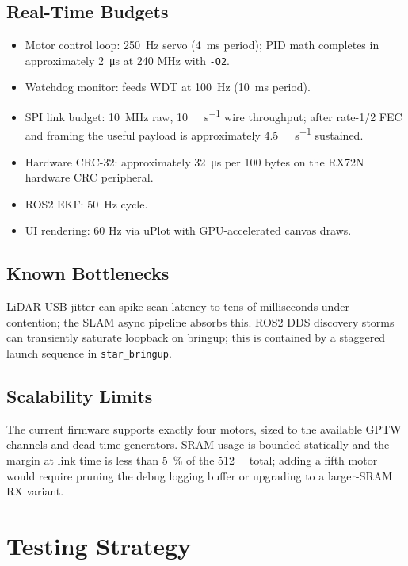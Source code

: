 \documentclass[11pt,letterpaper]{article}
\begin{document}
\subsection{Real-Time Budgets}
\begin{itemize}[leftmargin=1.4em,itemsep=2pt]
\item Motor control loop: \qty{250}{\hertz} servo
      (\qty{4}{\milli\second} period); PID math completes in
      approximately \qty{2}{\micro\second} at 240 MHz with \texttt{-O2}.
\item Watchdog monitor: feeds WDT at \qty{100}{\hertz}
      (\qty{10}{\milli\second} period).
\item SPI link budget: \qty{10}{\mega\hertz} raw,
      \qty{10}{\mega\bit\per\second} wire throughput; after rate-1/2
      FEC and framing the useful payload is approximately
      \qty{4.5}{\mega\bit\per\second} sustained.
\item Hardware CRC-32: approximately \qty{32}{\micro\second} per 100
      bytes on the RX72N hardware CRC peripheral.
\item ROS2 EKF: \qty{50}{\hertz} cycle.
\item UI rendering: 60 Hz via uPlot with GPU-accelerated canvas draws.
\end{itemize}

\subsection{Known Bottlenecks}
LiDAR USB jitter can spike scan latency to tens of milliseconds under
contention; the SLAM async pipeline absorbs this. ROS2 DDS discovery
storms can transiently saturate loopback on bringup; this is contained
by a staggered launch sequence in \texttt{star\_bringup}.

\subsection{Scalability Limits}
The current firmware supports exactly four motors, sized to the
available GPTW channels and dead-time generators. SRAM usage is
bounded statically and the margin at link time is less than
\qty{5}{\percent} of the \qty{512}{\kilo\byte} total; adding a fifth
motor would require pruning the debug logging buffer or upgrading to a
larger-SRAM RX variant.

\section{Testing Strategy}
\label{sec:testing}
\end{document}
